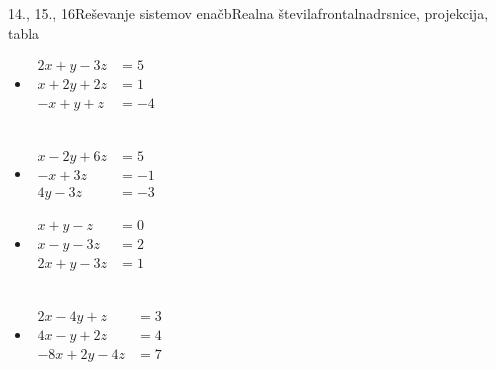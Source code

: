 \begin{priprava}{14., 15., 16}{}{Reševanje sistemov enačb}{Realna števila}{frontalna}{drsnice, projekcija, tabla}
\begin{naloga}
\begin{multicols}{2}
\begin{itemize}
                        \item $\begin{aligned}
                            2x+y-3z&=5 \\ x+2y+2z&=1 \\ -x+y+z&=-4
                        \end{aligned}$ \\~\\
                        \item $\begin{aligned}
                            x-2y+6z&=5 \\ -x+3z&=-1 \\ 4y-3z&=-3
                        \end{aligned}$ 
                        \item $\begin{aligned}
                            x+y-z&=0 \\ x-y-3z&=2 \\ 2x+y-3z&=1
                        \end{aligned}$ \\~\\
                        \item $\begin{aligned}
                            2x-4y+z&=3 \\ 4x-y+2z&=4 \\ -8x+2y-4z&=7
                        \end{aligned}$ 
                    

                \end{itemize}
            \end{multicols}
            \end{naloga}
        

    
\end{priprava}